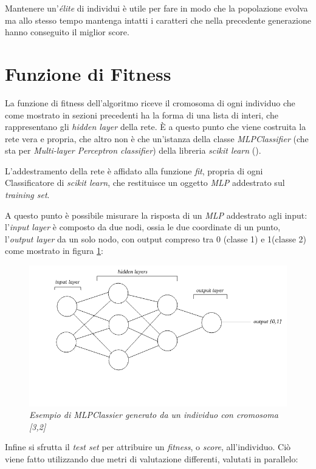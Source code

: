 \documentclass[12pt,a4paper]{report}
\begin{document}
Mantenere un'\textit{élite} di individui è utile per fare in modo che la popolazione evolva ma allo stesso tempo mantenga intatti i caratteri che nella precedente generazione hanno conseguito il miglior score.

\section{Funzione di Fitness}

La funzione di fitness dell'algoritmo riceve il cromosoma di ogni individuo che come mostrato in sezioni precedenti ha la forma di una lista di interi, che rappresentano gli \textit{hidden layer} della rete.
È a questo punto che viene costruita la rete vera e propria, che altro non è che un'istanza della classe \textit{MLPClassifier} (che sta per \textit{Multi-layer Perceptron classifier}) della libreria \textit{scikit learn} (\cite{scikit-learn}).

L'addestramento della rete è affidato alla funzione \textit{fit}, propria di ogni Classificatore di \textit{scikit learn}, che restituisce un oggetto \textit{MLP} addestrato sul \textit{training set}.

A questo punto è possibile misurare la risposta di un \textit{MLP} addestrato agli input: l'\textit{input layer} è composto da due nodi, ossia le due coordinate di un punto, l'\textit{output layer} da un solo nodo, con output compreso tra 0 (classe 1) e 1(classe 2) come mostrato in figura \ref{MLP}:

\begin{figure}[H]
 \centering
 \includegraphics[scale = 0.55]{images/MLPClass}
 \caption {\textit{Esempio di MLPClassier generato da un individuo con cromosoma [3,2]}}
 \label{MLP}
\end{figure}

Infine si sfrutta il \textit{test set} per attribuire un \textit{fitness}, o \textit{score}, all'individuo.
Ciò viene fatto utilizzando due metri di valutazione differenti, valutati in parallelo: 
\end{document}
